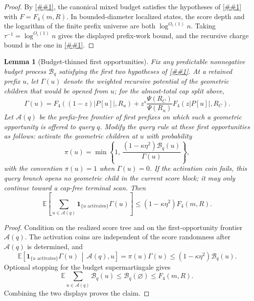 \documentclass[10pt]{article}
\newcommand{\cref}[1]{\ref{##1}}
\newtheorem{lemma}[theorem]{Lemma}
\theoremstyle{definition}
\newcommand{\E}{\mathbb{E}}
\begin{document}
\begin{proof}
   By \cref{lem:canonical-mixed-budget}, the canonical mixed budget satisfies
   the hypotheses of \cref{lem:budget-stable-prefix-list} with
   \(F=F_4(m,R)\).  In bounded-diameter localized states, the score depth and
   the logarithm of the finite prefix universe are both \(\log^{O_c(1)}n\).
   Taking \(\tau^{-1}=\log^{O_c(1)}n\) gives the displayed prefix-work bound,
   and the recursive charge bound is the one in
   \cref{lem:budget-stable-prefix-list}.
\end{proof}

\begin{lemma}[Budget-thinned first opportunities]\label{lem:budget-thinned-opportunities}
   Fix any predictable nonnegative budget process $\mathcal B_q$ satisfying the first two hypotheses of \cref{lem:bellman-frontier-certificate}. At a retained prefix $u$, let $\Gamma(u)$ denote the weighted recursive potential of the geometric children that would be opened from $u$; for the almost-total cap split above,
   \[
      \Gamma(u)=
      F_4((1-z)|P[u]|,R_u)
      +
      z^s\frac{\Psi(R_C)}{\Psi(R_u)}F_4(z|P[u]|,R_C).
   \]
   Let $\mathcal A(q)$ be the prefix-free frontier of first prefixes on which such a geometric opportunity is offered to query $q$. Modify the query rule at these first opportunities as follows: activate the geometric children at $u$ with probability
   \[
      \pi(u)=
      \min\left\{
         1,\,
         \frac{(1-\kappa\eta^2)\mathcal B_q(u)}{\Gamma(u)}
      \right\},
   \]
   with the convention $\pi(u)=1$ when $\Gamma(u)=0$. If the activation coin fails, this query branch opens no geometric child in the current score block; it may only continue toward a cap-free terminal scan. Then
   \[
      \E\left[
         \sum_{u\in\mathcal A(q)}
         \mathbf 1_{\{\text{$u$ activates}\}}\Gamma(u)
      \right]
      \le
      (1-\kappa\eta^2)F_4(m,R).
   \]
\end{lemma}

\begin{proof}
   Condition on the realized score tree and on the first-opportunity frontier $\mathcal A(q)$. The activation coins are independent of the score randomness after $\mathcal A(q)$ is determined, and
   \[
      \E\!\left[
         \mathbf 1_{\{\text{$u$ activates}\}}\Gamma(u)
         \,\middle|\,\mathcal A(q),u
      \right]
      =
      \pi(u)\Gamma(u)
      \le
      (1-\kappa\eta^2)\mathcal B_q(u).
   \]
   Optional stopping for the budget supermartingale gives
   \[
      \E\sum_{u\in\mathcal A(q)}\mathcal B_q(u)
      \le
      \mathcal B_q(\varnothing)
      \le
      F_4(m,R).
   \]
   Combining the two displays proves the claim.
\end{proof}
\end{document}
